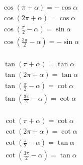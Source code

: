 \documentclass[a4paper, fleqn, fontset = mac]{ctexart}
\begin{document}
		\begin{minipage}{0.3\textwidth}
			\begin{align*}
			& \cos\left( \pi + \alpha \right) = -\cos\alpha \\
			& \cos\left( 2\pi + \alpha \right) = \cos\alpha \\
			& \cos\left( \frac\pi2 - \alpha \right) = \sin\alpha \\
			& \cos\left( \frac{3\pi}2 - \alpha \right) = -\sin\alpha \\
			\end{align*}
		\end{minipage}
		\begin{minipage}{0.3\textwidth}
			\begin{align*}
			& \tan\left( \pi + \alpha \right) = \tan\alpha \\
			& \tan\left( 2\pi + \alpha \right) = \tan\alpha \\
			& \tan\left( \frac\pi2 - \alpha \right) = \cot\alpha \\
			& \tan\left( \frac{3\pi}2 - \alpha \right) = \cot\alpha \\
			\end{align*}
		\end{minipage}
		\begin{minipage}{0.3\textwidth}
			\begin{align*}
			& \cot\left( \pi + \alpha \right) = \cot\alpha \\
			& \cot\left( 2\pi + \alpha \right) = \cot\alpha \\
			& \cot\left( \frac\pi2 - \alpha \right) = \tan\alpha \\
			& \cot\left( \frac{3\pi}2 - \alpha \right) = \tan\alpha \\
			\end{align*}
		\end{minipage}
		
\end{document}
